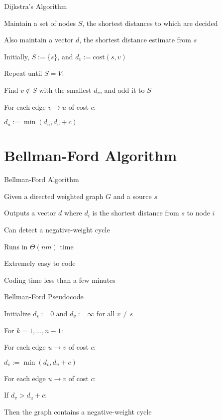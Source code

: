 \documentclass[13pt,onlymath]{beamer}
\begin{document}
\begin{frame}{Dijkstra's Algorithm}
\BIT
\item Maintain a set of nodes $S$, the shortest distances to which are decided
\item Also maintain a vector $d$, the shortest distance estimate from $s$
\item Initially, $S:= \{s\}$, and $d_v := \mathrm{cost}(s, v)$
\item Repeat until $S = V$:
\BIT
\item Find $v \notin S$ with the smallest $d_v$, and add it to $S$
\item For each edge $v \rightarrow u$ of cost $c$:
\BIT
\item $d_u := \min(d_u, d_v+c)$
\EIT \EIT \EIT
\end{frame}

\section{Bellman-Ford Algorithm}

\begin{frame}{Bellman-Ford Algorithm}
\BIT
\item Given a directed weighted graph $G$ and a source $s$
\item Outputs a vector $d$ where $d_i$ is the shortest distance from $s$ to node $i$
\item Can detect a negative-weight cycle
\item Runs in $\Theta(nm)$ time
\item Extremely easy to code
\BIT
\item Coding time less than a few minutes
\EIT \EIT
\end{frame}

\begin{frame}{Bellman-Ford Pseudocode}
\BIT
\item Initialize $d_s:=0$ and $d_v:=\infty$ for all $v \ne s$
\item For $k=1, \ldots, n-1$:
\BIT
\item For each edge $u \rightarrow v$ of cost $c$:
\BIT
\item $d_v := \min(d_v, d_u+c)$
\EIT \EIT
\item For each edge $u \rightarrow v$ of cost $c$:
\BIT
\item If $d_v > d_u + c$:
\BIT
\item Then the graph contains a negative-weight cycle
\EIT \EIT \EIT
\end{frame}
\end{document}
